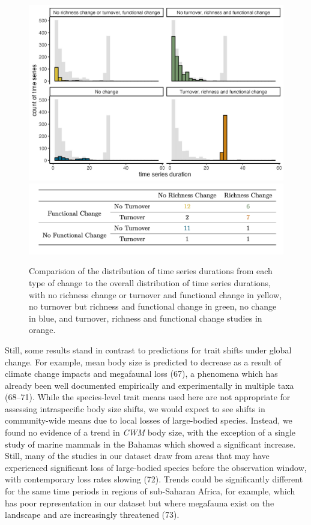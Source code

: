 \documentclass{article}
\begin{document}
\begin{figure}
\includegraphics[width=\textwidth]{../../figures/duration_hist} \includegraphics[width=\textwidth]{../../figures/functional_change_table} \caption{Comparision of the distribution of time series durations from each type of change to the overall distribution of time series durations, with no richness change or turnover and functional change in yellow, no turnover but richness and functional change in green, no change in blue, and turnover, richness and functional change studies in orange.}\label{fig:changeScenarios}
\end{figure}

Still, some results stand in contrast to predictions for trait shifts
under global change. For example, mean body size is predicted to
decrease as a result of climate change impacts and megafaunal loss (67),
a phenomena which has already been well documented empirically and
experimentally in multiple taxa (68--71). While the species-level trait
means used here are not appropriate for assessing intraspecific body
size shifts, we would expect to see shifts in community-wide means due
to local losses of large-bodied species. Instead, we found no evidence
of a trend in \emph{CWM} body size, with the exception of a single study
of marine mammals in the Bahamas which showed a significant increase.
Still, many of the studies in our dataset draw from areas that may have
experienced significant loss of large-bodied species before the
observation window, with contemporary loss rates slowing (72). Trends
could be significantly different for the same time periods in regions of
sub-Saharan Africa, for example, which has poor representation in our
dataset but where megafauna exist on the landscape and are increasingly
threatened (73).
\end{document}
